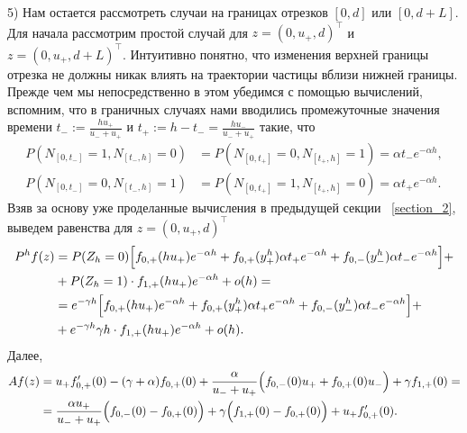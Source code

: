 \documentclass[12pt,a4paper]{article}
\begin{document}
5) Нам остается рассмотреть случаи на границах отрезков $[0, d]$ или $[0, d + L]$. Для начала рассмотрим простой случай для $z = \left(0, u_+, d\right)^\intercal$ и $z = \left(0, u_+, d + L\right)^\intercal$. Интуитивно понятно, что изменения верхней границы отрезка не должны никак влиять на траектории частицы вблизи нижней границы. Прежде чем мы непосредственно в этом убедимся с помощью вычислений, вспомним, что в граничных случаях нами вводились промежуточные значения времени $t_- := \displaystyle\frac{h u_+}{u_- + u_+}$ и $t_+ := h - t_- = \displaystyle\frac{h u_-}{u_- + u_+}$ такие, что 
\begin{equation*}
    \begin{aligned}
  P (N_{[0, t_-]} = 1, N_{[t_-, h]} = 0) &= P (N_{[0, t_+]} = 0, N_{[t_+, h]} = 1) = \alpha t_- e^{- \alpha h},\\
  P (N_{[0, t_-]} = 0, N_{[t_-, h]} = 1) &= P (N_{[0, t_+]} = 1, N_{[t_+, h]} = 0) = \alpha t_+ e^{- \alpha h}.
    \end{aligned}
\end{equation*}
Взяв за основу уже проделанные вычисления в предыдущей секции ~\eqref{section_2}, выведем равенства для $z = \left(0, u_+, d\right)^\intercal$
\begin{equation*}
    \begin{aligned} 
  P^h f (z) &= P (Z_h = 0) \Bigl[f_{0,+} (h u_+) e^{- \alpha h} + f_{0,+} (y^h_+) \alpha t_+ e^{- \alpha h} + f_{0,-} (y^h_- ) \alpha t_- e^{- \alpha h} \Bigr]  + \\
  & + P (Z_h = 1) \cdot f_{1, +} (h u_+) e^{- \alpha h} + o (h) =\\
  & = e^{- \gamma h} \Bigl[f_{0,+} (h u_+) e^{- \alpha h} + f_{0,+} (y^h_+) \alpha t_+ e^{- \alpha h} + f_{0,-} (y^h_- ) \alpha t_- e^{- \alpha h} \Bigr] +\\
  & + e^{- \gamma h} \gamma h \cdot f_{1, +} (h u_+) e^{- \alpha h} + o(h).
\end{aligned}
\end{equation*}
Далее,
\begin{equation*}
    \begin{aligned}
   A f(z) &= u_+ f_{0,+}' (0) - (\gamma + \alpha) f_{0,+} (0) + \frac{\alpha}{u_- + u_+} \Bigl(f_{0,-} (0) u_+ + f_{0,+} (0) u_- \Bigr) + \gamma f_{1,+} (0) = \\
& = \frac{\alpha u_+}{u_- + u_+} \Bigl(f_{0,-} (0) - f_{0,+} (0)\Bigr) + \gamma \Bigl( f_{1,+} (0) - f_{0,+} (0) \Bigr) + u_+ f_{0,+}' (0).
    \end{aligned}
\end{equation*}
\end{document}
